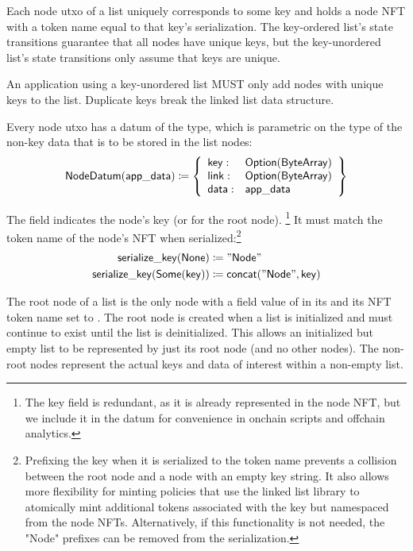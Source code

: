 \documentclass[../midgard.tex]{subfiles}
\begin{document}
Each node utxo of a list uniquely corresponds to some  key and holds a node NFT with a token name equal to that key's serialization. The key-ordered list's state transitions guarantee that all nodes have unique keys, but the key-unordered list's state transitions only assume that keys are unique.

\newcommand{\unorderedListWarning}[0]{
\begin{warningblock}
An application using a key-unordered list MUST only add nodes with unique keys to the list. Duplicate keys break the linked list data structure.
\end{warningblock}
}
\unorderedListWarning

Every node utxo has a datum of the  type, which is parametric on the  type of the non-key data that is to be stored in the list nodes:
\begin{equation*}
    \mathsf{NodeDatum} (\mathsf{app\_data}) \coloneq \left\{
    \begin{array}{ll}
        \mathsf{key}  : & \mathsf{Option}(\mathsf{ByteArray}) \\
        \mathsf{link} : & \mathsf{Option}(\mathsf{ByteArray}) \\
        \mathsf{data} : & \mathsf{app\_data}
    \end{array} \right\}
\end{equation*}

The  field indicates the node's key (or  for the root node). \footnote{The key field is redundant, as it is already represented in the node NFT, but we include it in the datum for convenience in onchain scripts and offchain analytics.} It must match the token name of the node's NFT when serialized:\footnote{Prefixing the key when it is serialized to the token name prevents a collision between the root node and a node with an empty key string. It also allows more flexibility for minting policies that use the linked list library to atomically mint additional tokens associated with the key but namespaced from the node NFTs. Alternatively, if this functionality is not needed, the "Node" prefixes can be removed from the serialization.}
\begin{align*}
    \mathsf{serialize\_key} (\mathsf{None}) &\coloneq \mathsf{"Node"} \\
    \mathsf{serialize\_key} (\mathsf{Some} (\mathsf{key})) &\coloneq \mathsf{concat("Node", key)} 
\end{align*}

The root node of a list is the only node with a  field value of  in its  and its NFT token name set to . The root node is created when a list is initialized and must continue to exist until the list is deinitialized. This allows an initialized but empty list to be represented by just its root node (and no other nodes). The non-root nodes represent the actual keys and data of interest within a non-empty list.
\end{document}
